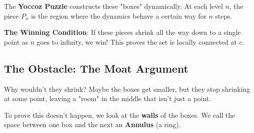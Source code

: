 The \textbf{Yoccoz Puzzle} constructs these "boxes" dynamically. At each level $n$, the piece $P_n$ is the region where the dynamics behave a certain way for $n$ steps.

\begin{center}
\end{center}

\textbf{The Winning Condition}: If these pieces shrink all the way down to a single point as $n$ goes to infinity, we win! This proves the set is locally connected at $c$.

\subsection{The Obstacle: The Moat Argument}

Why wouldn't they shrink? Maybe the boxes get smaller, but they stop shrinking at some point, leaving a "room" in the middle that isn't just a point.

To prove this doesn't happen, we look at the \textbf{walls} of the boxes. We call the space between one box and the next an \textbf{Annulus} (a ring).

\begin{center}
\end{center}


